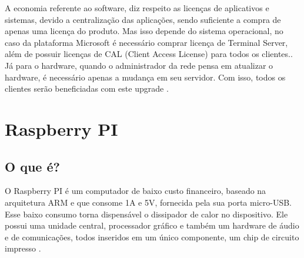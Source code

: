 \documentclass[
	12pt,				%
	openright,			%
	twoside,			%
	a4paper,			%
	chapter=TITLE,		%
	english,			%
	brazil				%
	]{abntex2}
\begin{document}
A economia referente ao software, diz respeito as licenças de aplicativos e sistemas, devido a centralização das aplicações, sendo suficiente a compra de apenas uma licença do produto. Mas isso depende do sistema operacional, no caso da plataforma Microsoft é necessário comprar licença de Terminal Server, além de possuir licenças de CAL (Client Access License) para todos os clientes.\cite{microsoft}. Já para o hardware, quando o administrador da rede pensa em atualizar o hardware, é necessário apenas a mudança em seu servidor. Com isso, todos os clientes serão beneficiadas com este upgrade \cite{EmailThinClient}.


\begin{table}[h!]
\end{table}

\newpage



\chapter{Raspberry PI}


\section{O que é?}


O Raspberry PI é um computador de baixo custo financeiro, baseado na arquitetura ARM e que consome 1A e 5V, fornecida pela sua porta micro-USB. Esse baixo consumo torna dispensável o dissipador de calor no dispositivo. Ele possui uma unidade central, processador gráfico e também um hardware de áudio e de comunicações, todos inseridos em um único componente, um chip de circuito impresso \cite{eben2013raspberry, raspberrypi.org}.
\end{document}
